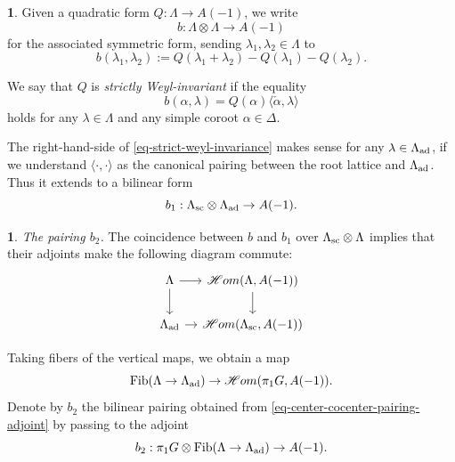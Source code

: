 \documentclass[10pt,english,reqno]{amsart}
\newcommand{\SHom}{\mathscr{H}om}
\newcommand{\Fib}{\mathrm{Fib}}
\newcommand{\sconn}{\textnormal{sc}}
\newcommand{\adjoint}{\textnormal{ad}}
\theoremstyle{definition}
\numberwithin{equation}{section}
\newtheorem{untitledsubsubsection}[subsubsection]{}
\newenvironment{void}
{\begin{untitledsubsubsection}}
{\end{untitledsubsubsection}}
\begin{document}

\begin{void}
\label{void-strict-weyl-invariant-forms}
Given a quadratic form $Q : \Lambda \rightarrow A(-1)$, we write
$$
b : \Lambda \otimes \Lambda \rightarrow A(-1)
$$
for the associated symmetric form, sending $\lambda_1, \lambda_2 \in \Lambda$ to
$$
b(\lambda_1, \lambda_2) := Q(\lambda_1 + \lambda_2) - Q(\lambda_1) - Q(\lambda_2).
$$

We say that $Q$ is \emph{strictly Weyl-invariant} if the equality
\begin{equation}
\label{eq-strict-weyl-invariance}
b(\alpha, \lambda) = Q(\alpha) \langle \check{\alpha}, \lambda\rangle
\end{equation}
holds for any $\lambda \in \Lambda$ and any simple coroot $\alpha \in \Delta$.

The right-hand-side of \eqref{eq-strict-weyl-invariance} makes sense for any $\lambda \in \Lambda_{\adjoint}$, if we understand $\langle\cdot, \cdot\rangle$ as the canonical pairing between the root lattice and $\Lambda_{\adjoint}$. Thus it extends to a bilinear form
$$
b_1 : \Lambda_{\sconn} \otimes \Lambda_{\adjoint} \rightarrow A(-1).
$$
\end{void}


\begin{void}\emph{The pairing $b_2$.}
The coincidence between $b$ and $b_1$ over $\Lambda_{\sconn}\otimes \Lambda$ implies that their adjoints make the following diagram commute:
\begin{equation}
\label{eq-strict-weyl-invariant-form-extension}
\begin{tikzcd}[column sep = 1em]
	\Lambda \ar[r]\ar[d] & \SHom(\Lambda, A(-1)) \ar[d] \\
	\Lambda_{\adjoint} \ar[r] & \SHom(\Lambda_{\sconn}, A(-1))
\end{tikzcd}
\end{equation}

Taking fibers of the vertical maps, we obtain a map
\begin{equation}
\label{eq-center-cocenter-pairing-adjoint}
\Fib(\Lambda \rightarrow \Lambda_{\adjoint}) \rightarrow \SHom(\pi_1G, A(-1)).
\end{equation}
Denote by $b_2$ the bilinear pairing obtained from \eqref{eq-center-cocenter-pairing-adjoint} by passing to the adjoint
\begin{equation}
\label{eq-center-cocenter-pairing}
b_2 : \pi_1 G\otimes \Fib(\Lambda \rightarrow \Lambda_{\adjoint}) \rightarrow A(-1).
\end{equation}
\end{void}
\end{document}
